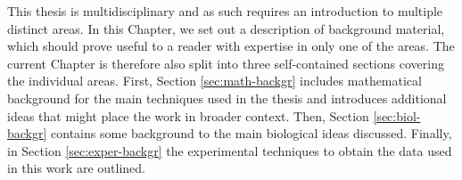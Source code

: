 
This thesis is multidisciplinary and as such requires an introduction to multiple distinct areas. In this Chapter, we set out a description of background material, which should prove useful to a reader with expertise in only one of the areas. The current Chapter is therefore also split into three self-contained sections covering the individual areas. First, Section \ref{sec:math-backgr} includes mathematical background for the main techniques used in the thesis and introduces additional ideas that might place the work in broader context. Then, Section \ref{sec:biol-backgr} contains some background to the main biological ideas discussed. Finally, in Section \ref{sec:exper-backgr} the experimental techniques to obtain the data used in this work are outlined.


